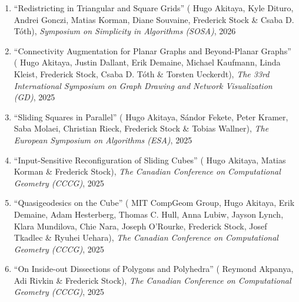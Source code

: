\documentclass[letterpaper,11pt]{article}
\makeatletter
\newcommand{\publication}[6]{
  \item ``#1'' %
   (\ignorespaces#2), %
     \emph{#3}, %
      #4%


}
\newcommand{\pdficon}{\faFilePdf}
\newcommand{\doilabel}{\texttt{DOI}}
\makeatother
\begin{document}
\begin{enumerate}
        \publication
          {Redistricting in Triangular and Square Grids}
          {
 Hugo Akitaya, Kyle Dituro, Andrei Gonczi, Matias Korman, Diane Souvaine, Frederick Stock \& Csaba D. Tóth}
          {Symposium on Simplicity in Algorithms (SOSA)}
          {2026}
          {%
%
%
\quad\href{https://doi.org/10.1137/1.9781611978964.2}{\doilabel}%
          }
          {6}
 \vspace{-.5em}  
      
        \publication
          {Connectivity Augmentation for Planar Graphs and Beyond-Planar Graphs}
          {
 Hugo Akitaya, Justin Dallant, Erik Demaine, Michael Kaufmann, Linda Kleist, Frederick Stock, Csaba D. Tóth \& Torsten Ueckerdt}
          {The 33rd International Symposium on Graph Drawing and Network Visualization (GD)}
          {2025}
          {%
%
%
%
          }
          {7}
 \vspace{-.5em}  
      
        \publication
          {Sliding Squares in Parallel}
          {
 Hugo Akitaya, Sándor Fekete, Peter Kramer, Saba Molaei, Christian Rieck, Frederick Stock \& Tobias Wallner}
          {The European Symposium on Algorithms (ESA)}
          {2025}
          {%
%
%
%
          }
          {8}
 \vspace{-.5em}  
      
        \publication
          {Input-Sensitive Reconfiguration of Sliding Cubes}
          {
 Hugo Akitaya, Matias Korman \& Frederick Stock}
          {The Canadian Conference on Computational Geometry (CCCG)}
          {2025}
          {%
\href{fred-stock.github.io/docstore/Input-Sensitive-Sliding-Cubes-CCCG.pdf}{\pdficon}%
%
%
          }
          {9}
 \vspace{-.5em}  
      
        \publication
          {Quasigeodesics on the Cube}
          {
 MIT CompGeom Group, Hugo Akitaya, Erik Demaine, Adam Hesterberg, Thomas C. Hull, Anna Lubiw, Jayson Lynch, Klara Mundilova, Chie Nara, Joseph O'Rourke, Frederick Stock, Josef Tkadlec \& Ryuhei Uehara}
          {The Canadian Conference on Computational Geometry (CCCG)}
          {2025}
          {%
\href{fred-stock.github.io/docstore/quasigeodesics-cube-cccg.pdf}{\pdficon}%
%
%
          }
          {10}
 \vspace{-.5em}  
      
        \publication
          {On Inside-out Dissections of Polygons and Polyhedra}
          {
 Reymond Akpanya, Adi Rivkin \& Frederick Stock}
          {The Canadian Conference on Computational Geometry (CCCG)}
          {2025}
          {%
\href{fred-stock.github.io/docstore/inside-out-dissections-cccg.pdf}{\pdficon}%
%
\quad\href{https://doi.org/10.48550/arXiv.2411.06584}{\doilabel}%
          }
          {11}
 \vspace{-.5em}  
      

\end{enumerate}
\end{document}
